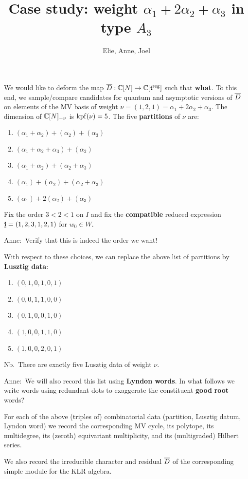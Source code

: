 \documentclass[11pt]{article}
\title{Case study: weight $\alpha_1 + 2\alpha_2 + \alpha_3$ in type $A_3$}
\author{Elie, Anne, Joel}
\newcommand{\anne}[1]{{\color{pink!50!blue}Anne:~#1}}
\newcommand{\todo}[1]{{\color{red!50!white}\textbf{#1}}} %
\begin{document}
\maketitle
%
We would like to deform the map $\overline{D} : \mathbb C[N]\to \mathbb C[{\mathfrak t}^{\rm reg}]$ such that \todo{what}. 
To this end, we sample/compare candidates for quantum and asymptotic versions of $\overline{D}$ on elements of the MV basis of weight $\nu = (1,2,1) = \alpha_1 + 2\alpha_2 + \alpha_3$. The dimension of $\mathbb C[N]_{-\nu}$ is $\operatorname{kpf}(\nu) = 5$. The five \todo{partitions} of $\nu$ are:
\begin{enumerate}
    \item $(\alpha_1 + \alpha_2) + (\alpha_2) + (\alpha_3)$
    \item $(\alpha_1 + \alpha_2 + \alpha_3) + (\alpha_2)$
    \item $(\alpha_1 + \alpha_2) + (\alpha_2 + \alpha_3)$
    \item $(\alpha_1) + (\alpha_2) + (\alpha_2 + \alpha_3)$
    \item $(\alpha_1) + 2(\alpha_2) + (\alpha_3)$
\end{enumerate}
% 
Fix the order $3 < 2 < 1$ on $I$ and fix the \todo{compatible} reduced expression $\underline{\mathbf{i}} = (1,2,3,1,2,1)$ for $w_0\in W$. 

\anne{Verify that this is indeed the order we want!} 

With respect to these choices, we can replace the above list of partitions by \todo{Lusztig data}:  
\begin{enumerate}
    \item $(0,1,0,1,0,1)$
    \item $(0,0,1,1,0,0)$
    \item $(0,1,0,0,1,0)$
    \item $(1,0,0,1,1,0)$
    \item $(1,0,0,2,0,1)$
\end{enumerate}
Nb.\ There are exactly five Lusztig data of weight $\nu$.

\anne{We will also record this list using \todo{Lyndon words}. In what follows we write words using redundant dots to exaggerate the constituent \todo{good} \todo{root} words?}

For each of the above (triples of) combinatorial data (partition, Lusztig datum, Lyndon word) we record the corresponding MV cycle, its polytope, its multidegree, its (zeroth) equivariant multiplicity, and its (multigraded) Hilbert series. 

We also record the irreducible character and residual $\overline{D}$ of the corresponding simple module for the KLR algebra. 
\end{document}
